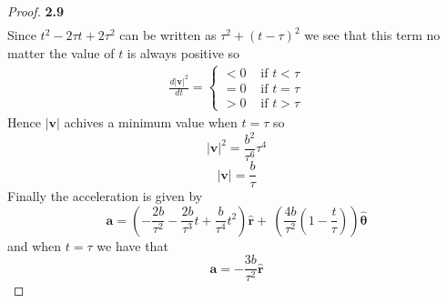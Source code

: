 \documentclass[11pt]{article}
\newcommand{\hatr}{\bm{\hat{r}}}
\newcommand{\hatth}{\bm{\hat{\theta}}}
\begin{document}
\begin{proof}{\textbf{2.9}}
\begin{align*}
        \end{align*}
        Since $t^2 - 2\tau t + 2\tau^2$ can be written as $\tau^2 + (t - \tau)^2$
        we see that this term no matter the value of $t$ is always positive so
        \begin{align*}
            \frac{d|\bm{v}|^2}{dt} = \begin{cases}
                <0 & \text{ if } t < \tau \\
                =0 & \text{ if } t = \tau \\
                >0 & \text{ if } t > \tau
            \end{cases}
        \end{align*}
        Hence $|\bm{v}|$ achives a minimum value when $t = \tau$ so
        $$|\bm{v}|^2 = \frac{b^2}{\tau^6}\tau^4$$
        $$|\bm{v}| = \frac{b}{\tau}$$
        Finally the acceleration is given by
        $$ \bm{a} = (-\frac{2b}{\tau^2} - \frac{2b}{\tau^3}t + \frac{b}{\tau^4}t^2) \hatr +\ 
        (\frac{4b}{\tau^2}(1 - \frac{t}{\tau}))\hatth$$
        and when $t = \tau$ we have that
        $$ \bm{a} = -\frac{3b}{\tau^2} \hatr$$
    \end{proof}
\end{document}
